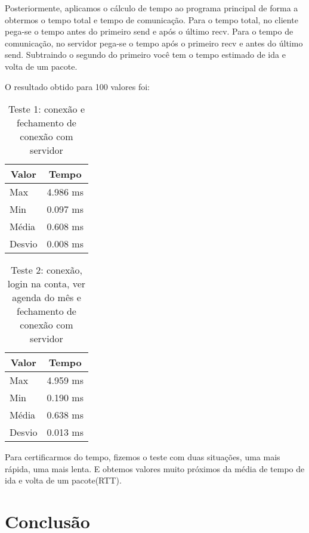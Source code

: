 \documentclass[10pt,a4paper]{article}
\begin{document}
Posteriormente, aplicamos o cálculo de tempo ao programa principal de
forma a obtermos o tempo total e tempo de comunicação.
Para o tempo total, no cliente pega-se  o tempo antes do primeiro send e após o último recv.
Para o tempo de comunicação, no servidor pega-se o tempo após o
primeiro recv e antes do último send.
Subtraindo o segundo do primeiro você tem o tempo estimado de ida e
volta de um pacote. 

O resultado obtido para 100 valores foi:

\begin{table}[h!]
\caption{Teste 1: conexão e fechamento de conexão com servidor}
\begin{center}
  \begin{tabular}{lr}
    \multicolumn{1}{c}{Valor} & \multicolumn{1}{c}{Tempo}\\
    \hline
    Max & 4.986 ms\\
    Min & 0.097 ms\\
    Média & 0.608 ms \\
    Desvio & 0.008 ms
  \end{tabular}

\end{center}
\end{table}

\begin{table}[h!]
\caption{Teste 2: conexão, login na conta, ver agenda do mês e fechamento de conexão com servidor}
\begin{center}
  \begin{tabular}{lr}
    \multicolumn{1}{c}{Valor} & \multicolumn{1}{c}{Tempo}\\
    \hline
    Max & 4.959 ms\\
    Min & 0.190 ms\\
    Média & 0.638 ms \\
    Desvio & 0.013 ms
  \end{tabular}

\end{center}
\end{table}

Para certificarmos do tempo, fizemos o teste com
duas situações, uma mais rápida, uma mais lenta. E obtemos valores
muito próximos da média de tempo de ida e volta de um pacote(RTT). 

\section{Conclusão}


\begin{small}
  
\end{small}
\end{document}

